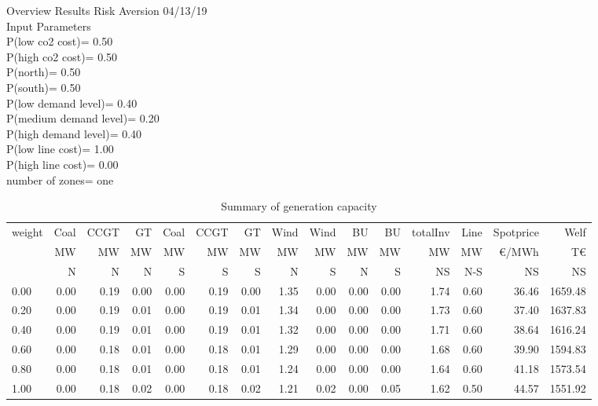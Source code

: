 \documentclass[landscape]{article}
\begin{document}
Overview Results Risk Aversion 04/13/19\\
Input Parameters\\
P(low co2 cost)=         0.50\\
P(high co2 cost)=         0.50\\
P(north)=         0.50\\
P(south)=         0.50\\
P(low demand level)=         0.40\\
P(medium demand level)=         0.20\\
P(high demand level)=         0.40\\
P(low line cost)=         1.00\\
P(high line cost)=         0.00\\
number of zones= one\\
\begin{table}[htb]\caption{Summary of generation capacity}
\begin{tabular}{l|rrrrrr|rr|rr|rr|rr}
\toprule
 weight &    Coal &     CCGT &      GT &   Coal  &   CCGT &      GT &    Wind &    Wind  &  BU  &  BU  & totalInv  &    Line   &  Spotprice   &  Welf   \\
        &      MW &       MW &      MW &      MW &     MW &      MW &      MW &      MW  &  MW  &  MW  &    MW     &    MW     &  \euro/MWh &  T\euro   \\
        &       N &       N  &      N  &      S  &      S &       S &       N &       S  &  N   &  S   &    NS     &    N-S    &  NS      &   NS    \\
\midrule
        0.00&        0.00&        0.19&        0.00&        0.00&        0.19&        0.00&        1.35&        0.00&        0.00&        0.00&        1.74&        0.60&       36.46&     1659.48\\
        0.20&        0.00&        0.19&        0.01&        0.00&        0.19&        0.01&        1.34&        0.00&        0.00&        0.00&        1.73&        0.60&       37.40&     1637.83\\
        0.40&        0.00&        0.19&        0.01&        0.00&        0.19&        0.01&        1.32&        0.00&        0.00&        0.00&        1.71&        0.60&       38.64&     1616.24\\
        0.60&        0.00&        0.18&        0.01&        0.00&        0.18&        0.01&        1.29&        0.00&        0.00&        0.00&        1.68&        0.60&       39.90&     1594.83\\
        0.80&        0.00&        0.18&        0.01&        0.00&        0.18&        0.01&        1.24&        0.00&        0.00&        0.00&        1.64&        0.60&       41.18&     1573.54\\
        1.00&        0.00&        0.18&        0.02&        0.00&        0.18&        0.02&        1.21&        0.02&        0.00&        0.05&        1.62&        0.50&       44.57&     1551.92\\
\bottomrule
\end{tabular}
\end{table}
\clearpage
\end{document}
